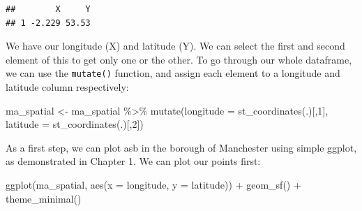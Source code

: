 \documentclass[
  krantz2]{krantz}
\makeatletter
\newenvironment{Shaded}{\begin{snugshade}}{\end{snugshade}}
\newcommand{\AttributeTok}[1]{\textcolor[rgb]{0.61,0.61,0.61}{#1}}
\newcommand{\DecValTok}[1]{\textcolor[rgb]{0.06,0.06,0.06}{#1}}
\newcommand{\FunctionTok}[1]{\textcolor[rgb]{0,0,0}{#1}}
\newcommand{\NormalTok}[1]{#1}
\newcommand{\OtherTok}[1]{\textcolor[rgb]{0.37,0.37,0.37}{#1}}
\newcommand{\SpecialCharTok}[1]{\textcolor[rgb]{0,0,0}{#1}}
\newenvironment{kframe}{%
\medskip{}
\setlength{\fboxsep}{.8em}
 \def\at@end@of@kframe{}%
 \ifinner\ifhmode%
  \def\at@end@of@kframe{\end{minipage}}%
  \begin{minipage}{\columnwidth}%
 \fi\fi%
 \def\FrameCommand##1{\hskip\@totalleftmargin \hskip-\fboxsep
 \colorbox{shadecolor}{##1}\hskip-\fboxsep
     \hskip-\linewidth \hskip-\@totalleftmargin \hskip\columnwidth}%
 \MakeFramed {\advance\hsize-\width
   \@totalleftmargin\z@ \linewidth\hsize
   \@setminipage}}%
 {\par\unskip\endMakeFramed%
 \at@end@of@kframe}
\renewenvironment{Shaded}{\begin{kframe}}{\end{kframe}}
\makeatother
\begin{document}
\begin{verbatim}
##        X     Y
## 1 -2.229 53.53
\end{verbatim}

We have our longitude (X) and latitude (Y). We can select the first and second element of this to get only one or the other. To go through our whole dataframe, we can use the \texttt{mutate()} function, and assign each element to a longitude and latitude column respectively:

\begin{Shaded}
\begin{Highlighting}[]
\NormalTok{ma\_spatial }\OtherTok{\textless{}{-}}\NormalTok{ ma\_spatial }\SpecialCharTok{\%\textgreater{}\%} 
  \FunctionTok{mutate}\NormalTok{(}\AttributeTok{longitude =} \FunctionTok{st\_coordinates}\NormalTok{(.)[,}\DecValTok{1}\NormalTok{],}
         \AttributeTok{latitude =} \FunctionTok{st\_coordinates}\NormalTok{(.)[,}\DecValTok{2}\NormalTok{])}
\end{Highlighting}
\end{Shaded}

As a first step, we can plot asb in the borough of Manchester using simple ggplot, as demonstrated in Chapter 1. We can plot our points first:

\begin{Shaded}
\begin{Highlighting}[]
\FunctionTok{ggplot}\NormalTok{(ma\_spatial, }\FunctionTok{aes}\NormalTok{(}\AttributeTok{x =}\NormalTok{ longitude, }\AttributeTok{y =}\NormalTok{ latitude)) }\SpecialCharTok{+}
  \FunctionTok{geom\_sf}\NormalTok{() }\SpecialCharTok{+} 
  \FunctionTok{theme\_minimal}\NormalTok{()}
\end{Highlighting}
\end{Shaded}
\end{document}
